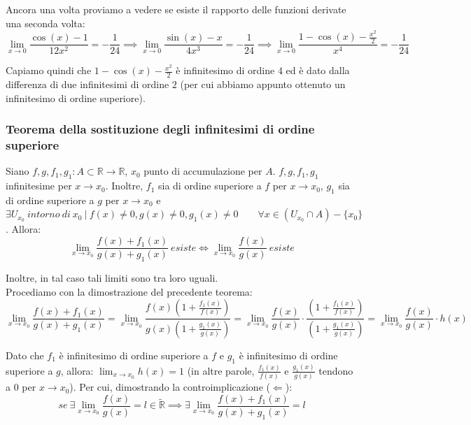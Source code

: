 \documentclass{article}
\begin{document}
\noindent Ancora una volta proviamo a vedere se esiste il rapporto delle funzioni derivate una seconda volta:
\begin{equation*}
    \lim_{x \to 0} \frac{\cos(x) - 1}{12x^2} = -\frac{1}{24} \implies \lim_{x \to 0} \frac{\sin(x) - x}{4x^3} = -\frac{1}{24} \implies \lim_{x \to 0} \frac{1 - \cos(x) - \frac{x^2}{2}}{x^4} = -\frac{1}{24}
\end{equation*}

\noindent Capiamo quindi che $1 - \cos(x) - \frac{x^2}{2}$ è infinitesimo di ordine $4$ ed è dato dalla differenza di due infinitesimi di ordine $2$ (per cui abbiamo appunto ottenuto un infinitesimo di ordine superiore).

\subsubsection{Teorema della sostituzione degli infinitesimi di ordine superiore}
Siano $f, g, f_1, g_1: A \subset \mathbb{R} \xrightarrow{} \mathbb{R}$, $x_0$ punto di accumulazione per $A$. $f, g, f_1, g_1$ infinitesime per $x \to x_0$. Inoltre, $f_1$ sia di ordine superiore a $f$ per $x \to x_0$, $g_1$ sia di ordine superiore a $g$ per $x \to x_0$ e $\exists U_{x_0} \ intorno \ di \ x_0 \ | \ f(x) \neq 0, g(x) \neq 0, g_1(x) \neq 0 \qquad \forall x \in (U_{x_0} \cap A) - \{x_0\}$. Allora:
\begin{equation*}
    \lim_{x \to x_0} \frac{f(x) + f_1(x)}{g(x) + g_1(x)} \ esiste \iff \lim_{x \to x_0} \frac{f(x)}{g(x)} \ esiste
\end{equation*}

\noindent Inoltre, in tal caso tali limiti sono tra loro uguali.\\

\noindent Procediamo con la dimostrazione del precedente teorema:
\begin{equation}
    \lim_{x \to x_0} \frac{f(x) + f_1(x)}{g(x) + g_1(x)} = \lim_{x \to x_0} \frac{f(x)\left(1 + \frac{f_1(x)}{f(x)}\right)}{g(x)\left(1 + \frac{g_1(x)}{g(x)}\right)} = \lim_{x \to x_0} \frac{f(x)}{g(x)} \cdot \frac{\left(1 + \frac{f_1(x)}{f(x)}\right)}{\left(1 + \frac{g_1(x)}{g(x)}\right)} = \lim_{x \to x_0} \frac{f(x)}{g(x)} \cdot h(x)
    \label{eq:14}
\end{equation} 

\noindent Dato che $f_1$ è infinitesimo di ordine superiore a $f$ e $g_1$ è infinitesimo di ordine superiore a $g$, allora: $\lim_{x \to x_0} h(x) = 1$ (in altre parole, $\frac{f_1(x)}{f(x)}$ e $\frac{g_1(x)}{g(x)}$ tendono a $0$ per $x \to x_0$). Per cui, dimostrando la controimplicazione ($\Leftarrow$):
\begin{equation*}
    se \ \exists \lim_{x \to x_0} \frac{f(x)}{g(x)} = l \in \widetilde{\mathbb{R}} \implies \exists \lim_{x \to x_0} \frac{f(x) + f_1(x)}{g(x) + g_1(x)} = l
\end{equation*}
\end{document}
